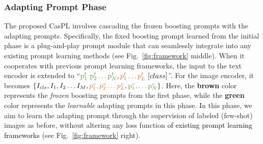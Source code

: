 \documentclass[runningheads]{llncs}
\newcommand{\implus}[1]{\textcolor{black}{#1}}
\begin{document}
{{\subsubsection{Adapting Prompt Phase}
The proposed CasPL involves cascading the frozen boosting prompts with the adapting prompts. Specifically, the fixed boosting prompt learned from the initial phase is a plug-and-play prompt module that can seamlessly integrate into any existing prompt learning methods (see Fig.~\ref{fig:framework} middle). When it cooperates with previous prompt learning frameworks, the input to the text encoder is extended to ``${\color{adapt_line}{\mathrm{p}_1^t \ \mathrm{p}_2^t\dots \mathrm{p}_N^t}},{\color{boost_line}{p_{1}^t \dots p_{L}^t}} \ [class]$''. For the image encoder, it becomes $\{I_{cls},I_1,I_2\dots I_M, {\color{boost_line}{p^v_1,p_2^v\dots p_L^v}},{\color{adapt_line}{\mathrm{p}^v_{1},\dots \mathrm{p}_{N}^v}} \}$. Here, the \textbf{\textcolor{boost_line}{brown}} color represents the \emph{frozen} boosting prompts from the first phase, while the \textbf{\textcolor{adapt_line}{green}} color represents the \emph{learnable} adapting prompts in this phase. 
In this phase, we aim to learn the adapting prompt through the supervision of labeled (few-shot) images as before, without altering any loss function \implus{of existing prompt learning frameworks} (see Fig.~\ref{fig:framework} right). 


}}
\end{document}

